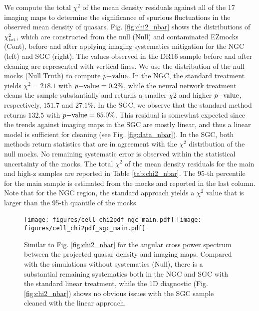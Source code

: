 We compute the total $\chi^{2}$ of the mean density residuals against all of the 17 imaging maps to determine the significance of spurious fluctuations in the observed mean density of quasars. Fig. \ref{fig:chi2_nbar} shows the distributions of $\chi^{2}_{\rm tot}$, which are constructed from the null (Null) and contaminated EZmocks (Cont), before and after applying imaging systematics mitigation for the NGC (left) and SGC (right). The values observed in the DR16 sample before and after cleaning are represented with vertical lines. We use the distribution of the null mocks (Null Truth) to compute $p{\rm -value}$. In the NGC, the standard treatment yields $\chi^{2}=218.1$ with $p{\rm -value}=0.2\%$, while the neural network treatment cleans the sample substantially and returns a smaller $\chi{2}$ and higher $p{\rm -value}$, respectively, $151.7$ and $27.1\%$. In the SGC, we observe that the standard method returns $132.5$ with $p{\rm -value}=65.0\%$. This residual is somewhat expected since the trends against imaging maps in the SGC are mostly linear, and thus a linear model is sufficient for cleaning (see Fig. \ref{fig:data_nbar}). In the SGC, both methods return statistics that are in agreement with the $\chi^{2}$ distribution of the null mocks. No remaining systematic error is observed within the statistical uncertainty of the mocks. The total $\chi^{2}$ of the mean density residuals for the main and high-z samples are reported in Table \ref{tab:chi2_nbar}. The 95-th percentile for the main sample is estimated from the mocks and reported in the last column. Note that for the NGC region, the standard approach yields a $\chi^{2}$ value that is larger than the 95-th quantile of the mocks.

\begin{figure*}
    \centering
    \texttt{[image: figures/cell\_chi2pdf\_ngc\_main.pdf]}
    \texttt{[image: figures/cell\_chi2pdf\_sgc\_main.pdf]}
    \caption[Total chi-squared value of eBOSS quasars from cross power spectra.]{Similar to Fig. \ref{fig:chi2_nbar} for the angular cross power spectrum between the projected quasar density and imaging maps. Compared with the simulations without systematics (Null), there is a substantial remaining systematics both in the NGC and SGC with the standard linear treatment, while the 1D diagnostic (Fig. \ref{fig:chi2_nbar}) shows no obvious issues with the SGC sample cleaned with the linear approach.}
    \label{fig:chi2_cell}
\end{figure*}

